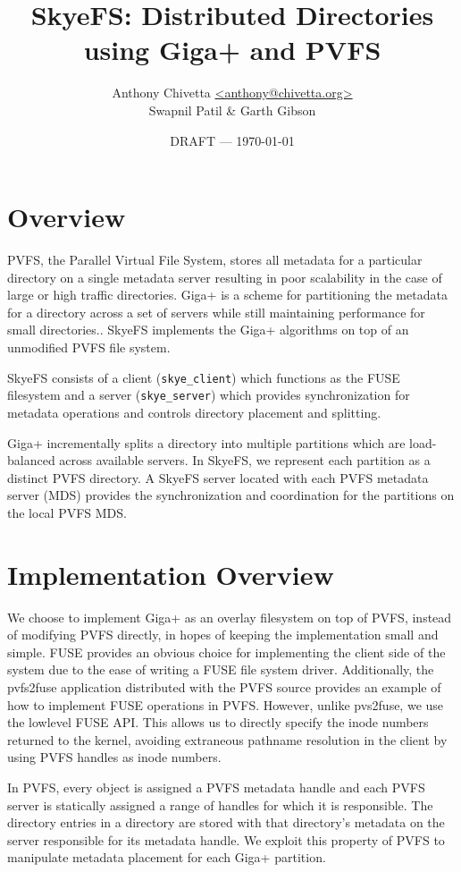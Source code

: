 \documentclass[twocolumn,letterpaper]{article}
\title{SkyeFS: Distributed Directories using Giga+ and PVFS}
\author{Anthony Chivetta \url{<anthony@chivetta.org>}\\Swapnil Patil \& Garth
Gibson}
\date{DRAFT --- \today}
\newcommand{\code}[1]{\texttt{#1}}
\begin{document}
\maketitle

\section{Overview}
PVFS, the Parallel Virtual File System, stores all metadata for a particular
directory on a single metadata server resulting in poor scalability in the case
of large or high traffic directories.  Giga+ is a scheme for partitioning the
metadata for a directory across a set of servers while still maintaining
performance for small directories..  SkyeFS implements the Giga+ algorithms on
top of an unmodified PVFS file system.

SkyeFS consists of a client (\code{skye\_\-client}) which functions as the
FUSE filesystem and a server (\code{skye\_\-server}) which provides
synchronization for metadata operations and controls directory placement and
splitting.  

Giga+ incrementally splits a directory into multiple partitions which are
load-balanced across available servers.  In SkyeFS, we represent each
partition as a distinct PVFS directory.  A SkyeFS server located with each
PVFS metadata server (MDS) provides the synchronization and coordination for
the partitions on the local PVFS MDS. 

\section{Implementation Overview}
We choose to implement Giga+ as an overlay filesystem on top of PVFS, instead
of modifying PVFS directly, in hopes of keeping the implementation small and
simple.  FUSE provides an obvious choice for implementing the client side of
the system due to the ease of writing a FUSE file system driver.
Additionally, the pvfs2\-fuse application distributed with the PVFS source
provides an example of how to implement FUSE operations in PVFS.  However,
unlike pvs2\-fuse, we use the lowlevel FUSE API.  This allows us to directly
specify the inode numbers returned to the kernel, avoiding extraneous pathname
resolution in the client by using PVFS handles as inode numbers.

In PVFS, every object is assigned a PVFS metadata handle and each PVFS server
is statically assigned a range of handles for which it is responsible.  
The directory entries in a directory are stored with that directory's metadata
on the server responsible for its metadata handle.  We exploit this property
of PVFS to manipulate metadata placement for each Giga+ partition.
\end{document}
